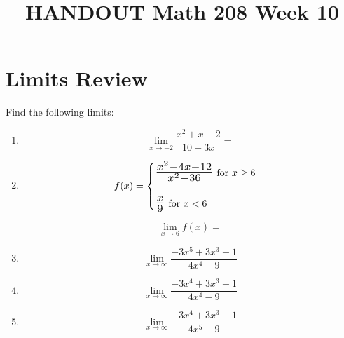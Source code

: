 \documentclass[14pt]{extarticle}
\title{\vspace{-5ex}HANDOUT Math 208 Week 10}
\date{\vspace{-10ex}}
\newcommand*{\Scale}[2][1.5]{\scalebox{#1}{\ensuremath{#2}}}%
\begin{document}
\maketitle		

\section{Limits Review}
Find the following limits:
\begin{enumerate}
	\item \begin{fleqn}	\begin{equation*}
			\lim_{x\to -2}\frac{x^2 + x - 2}{10-3x} =
	\end{equation*}	\end{fleqn}
	\vspace{.5cm}
	
	\item
\begin{fleqn}
	\begin{equation*}f(x) =\begin{cases}
			\Scale{\frac{x^2 -4x - 12}{x^2 -36}} \text{ for $x\geq 6$}\\\\
			\Scale{\frac{x}{9}} \text{ for $x < 6$}
	\end{cases} \end{equation*}
\end{fleqn}
	\begin{fleqn}\begin{equation*}\lim_{x\to 6}f(x) =\end{equation*} \end{fleqn}
	\vspace{1.5cm}
	
	\item \begin{fleqn}\begin{equation*}\lim_{x\to \infty}\frac{-3x^5 +3x^3 + 1}{4x^4-9} \end{equation*} \end{fleqn}
	\vspace{1cm}
	
	\item \begin{fleqn}\begin{equation*}\lim_{x\to \infty}\frac{-3x^4 +3x^3 + 1}{4x^4-9} \end{equation*} \end{fleqn}
	\vspace{1cm}
	
	\item 
	\begin{fleqn}\begin{equation*}\lim_{x\to \infty}\frac{-3x^4 +3x^3 + 1}{4x^5-9} \end{equation*} \end{fleqn}
	\vspace{1cm}
\end{enumerate}
\end{document}
